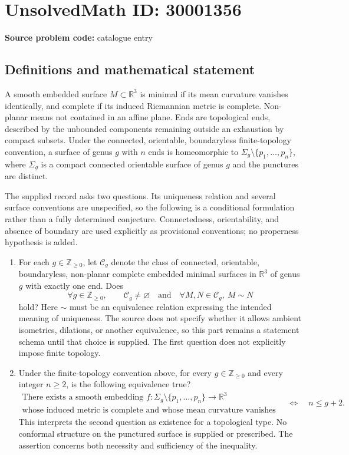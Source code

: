 \documentclass[11pt]{article}
\newcommand{\Z}{\mathbb{Z}}
\newcommand{\R}{\mathbb{R}}
\begin{document}
\section*{UnsolvedMath ID: 30001356}
\textbf{Source problem code:} catalogue entry
\subsection{Definitions and mathematical statement}
A smooth embedded surface \(M\subset\R^3\) is minimal if its mean curvature vanishes identically, and complete if its induced Riemannian metric is complete. Non-planar means not contained in an affine plane. Ends are topological ends, described by the unbounded components remaining outside an exhaustion by compact subsets. Under the connected, orientable, boundaryless finite-topology convention, a surface of genus \(g\) with \(n\) ends is homeomorphic to \(\Sigma_g\setminus\{p_1,\ldots,p_n\}\), where \(\Sigma_g\) is a compact connected orientable surface of genus \(g\) and the punctures are distinct.

The supplied record asks two questions. Its uniqueness relation and several surface conventions are unspecified, so the following is a conditional formulation rather than a fully determined conjecture. Connectedness, orientability, and absence of boundary are used explicitly as provisional conventions; no properness hypothesis is added.

\begin{enumerate}
\item For each \(g\in\Z_{\geq0}\), let \(\mathcal C_g\) denote the class of connected, orientable, boundaryless, non-planar complete embedded minimal surfaces in \(\R^3\) of genus \(g\) with exactly one end. Does
\[
\forall g\in\Z_{\geq0},\qquad
\mathcal C_g\ne\varnothing
\quad\text{and}\quad
\forall M,N\in\mathcal C_g,\ M\sim N
\]
hold? Here \(\sim\) must be an equivalence relation expressing the intended meaning of uniqueness. The source does not specify whether it allows ambient isometries, dilations, or another equivalence, so this part remains a statement schema until that choice is supplied. The first question does not explicitly impose finite topology.

\item Under the finite-topology convention above, for every \(g\in\Z_{\geq0}\) and every integer \(n\geq2\), is the following equivalence true?
\[
\begin{gathered}
\text{There exists a smooth embedding }
 f:\Sigma_g\setminus\{p_1,\ldots,p_n\}\longrightarrow\R^3\\
\text{whose induced metric is complete and whose mean curvature vanishes}
\end{gathered}
\quad\Longleftrightarrow\quad n\leq g+2.
\]
This interprets the second question as existence for a topological type. No conformal structure on the punctured surface is supplied or prescribed. The assertion concerns both necessity and sufficiency of the inequality.
\end{enumerate}
\end{document}
